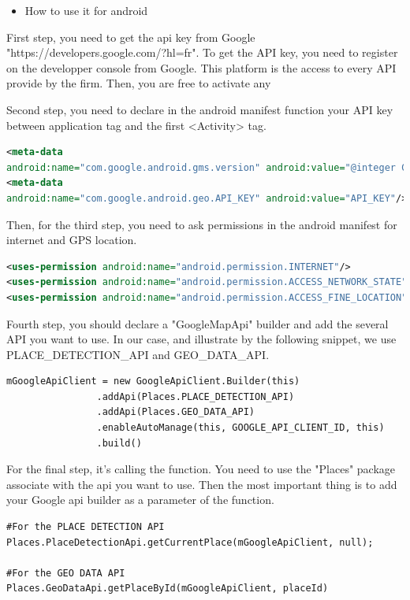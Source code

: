 \begin{itemize}
    \item {How to use it for android}
\end{itemize}
First step, you need to get the api key from Google "https://developers.google.com/?hl=fr". To get the API key, you need to register on the developper console from Google. This platform is the access to every API provide by the firm. Then, you are free to activate any

Second step, you need to declare in the android manifest function your API key between application tag and the first <Activity> tag.

\begin{lstlisting}[language=XML, basicstyle=\scriptsize]
<meta-data
android:name="com.google.android.gms.version" android:value="@integer Google_play_services_version"/>
<meta-data
android:name="com.google.android.geo.API_KEY" android:value="API_KEY"/>
\end{lstlisting}
Then, for the third step, you need to ask permissions in the android manifest for internet and GPS location.
\begin{lstlisting}[language=XML, basicstyle=\scriptsize]
<uses-permission android:name="android.permission.INTERNET"/>
<uses-permission android:name="android.permission.ACCESS_NETWORK_STATE"/>
<uses-permission android:name="android.permission.ACCESS_FINE_LOCATION"/>
\end{lstlisting}

Fourth step, you should declare a "GoogleMapApi" builder and add the several API you want to use. In our case, and illustrate by the following snippet, we use PLACE_DETECTION_API and GEO_DATA_API.

\begin{lstlisting}[language=XML, basicstyle=\scriptsize]
mGoogleApiClient = new GoogleApiClient.Builder(this)
                .addApi(Places.PLACE_DETECTION_API)
                .addApi(Places.GEO_DATA_API)
                .enableAutoManage(this, GOOGLE_API_CLIENT_ID, this)
                .build()
\end{lstlisting}

For the final step, it's calling the function. You need to use the "Places" package associate with the api you want to use. Then the most important thing is to add your Google api builder as a parameter of the function.
\begin{lstlisting}[language=XML, basicstyle=\scriptsize]
#For the PLACE DETECTION API
Places.PlaceDetectionApi.getCurrentPlace(mGoogleApiClient, null);

#For the GEO DATA API
Places.GeoDataApi.getPlaceById(mGoogleApiClient, placeId)
\end{lstlisting}

